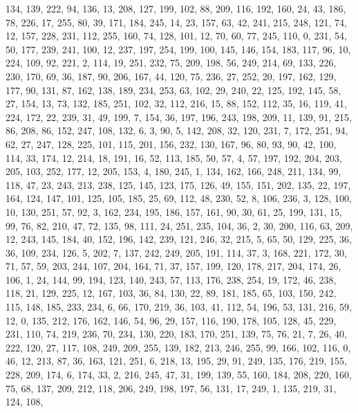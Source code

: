 \begin{DoxyCode}
       134, 139, 222, 94, 136, 13, 208, 127, 199, 102, 88, 209, 116, 192, 160, 24, 43, 186, 78, 226, 17, 255, 80,
       39, 171, 184, 245, 14, 23, 157, 63, 42, 241, 215, 248, 121, 74, 12, 157, 228, 231, 112, 255, 160, 74, 128,
       101, 12, 70, 60, 77, 245, 110, 0, 231, 54, 50, 177, 239, 241, 100, 12, 237, 197, 254, 199, 100, 145, 146,
       154, 183, 117, 96, 10, 224, 109, 92, 221, 2, 114, 19, 251, 232, 75, 209, 198, 56, 249, 214, 69, 133, 226, 230,
       170, 69, 36, 187, 90, 206, 167, 44, 120, 75, 236, 27, 252, 20, 197, 162, 129, 177, 90, 131, 87, 162, 138,
       189, 234, 253, 63, 102, 29, 240, 22, 125, 192, 145, 58, 27, 154, 13, 73, 132, 185, 251, 102, 32, 112, 216, 15,
       88, 152, 112, 35, 16, 119, 41, 224, 172, 22, 239, 31, 49, 199, 7, 154, 36, 197, 196, 243, 198, 209, 11,
       139, 91, 215, 86, 208, 86, 152, 247, 108, 132, 6, 3, 90, 5, 142, 208, 32, 120, 231, 7, 172, 251, 94, 62, 27,
       247, 128, 225, 101, 115, 201, 156, 232, 130, 167, 96, 80, 93, 90, 42, 100, 114, 33, 174, 12, 214, 18, 191, 16,
       52, 113, 185, 50, 57, 4, 57, 197, 192, 204, 203, 205, 103, 252, 177, 12, 205, 153, 4, 180, 245, 1, 134,
       162, 166, 248, 211, 134, 99, 118, 47, 23, 243, 213, 238, 125, 145, 123, 175, 126, 49, 155, 151, 202, 135, 22,
       197, 164, 124, 147, 101, 125, 105, 185, 25, 69, 112, 48, 230, 52, 8, 106, 236, 3, 128, 100, 10, 130, 251, 57,
       92, 3, 162, 234, 195, 186, 157, 161, 90, 30, 61, 25, 199, 131, 15, 99, 76, 82, 210, 47, 72, 135, 98, 111,
       24, 251, 235, 104, 36, 2, 30, 200, 116, 63, 209, 12, 243, 145, 184, 40, 152, 196, 142, 239, 121, 246, 32,
       215, 5, 65, 50, 129, 225, 36, 36, 109, 234, 126, 5, 202, 7, 137, 242, 249, 205, 191, 114, 37, 3, 168, 221, 172,
       30, 71, 57, 59, 203, 244, 107, 204, 164, 71, 37, 157, 199, 120, 178, 217, 204, 174, 26, 106, 1, 24, 144,
       99, 194, 123, 140, 243, 57, 113, 176, 238, 254, 19, 172, 46, 238, 118, 21, 129, 225, 12, 167, 103, 36, 84,
       130, 22, 89, 181, 185, 65, 103, 150, 242, 115, 148, 185, 233, 234, 6, 66, 170, 219, 36, 103, 41, 112, 54, 196,
       53, 131, 216, 59, 12, 0, 135, 212, 176, 162, 146, 54, 96, 29, 157, 116, 190, 178, 105, 128, 45, 229, 231,
       110, 74, 219, 236, 70, 234, 130, 220, 183, 170, 251, 139, 75, 76, 21, 7, 26, 40, 222, 120, 27, 117, 108, 249,
       209, 255, 139, 182, 213, 246, 255, 99, 166, 102, 116, 0, 46, 12, 213, 87, 36, 163, 121, 251, 6, 218, 13,
       195, 29, 91, 249, 135, 176, 219, 155, 228, 209, 174, 6, 174, 33, 2, 216, 245, 47, 31, 199, 139, 55, 160, 184,
       208, 220, 160, 75, 68, 137, 209, 212, 118, 206, 249, 198, 197, 56, 131, 17, 249, 1, 135, 219, 31, 124, 108,

\end{DoxyCode}
